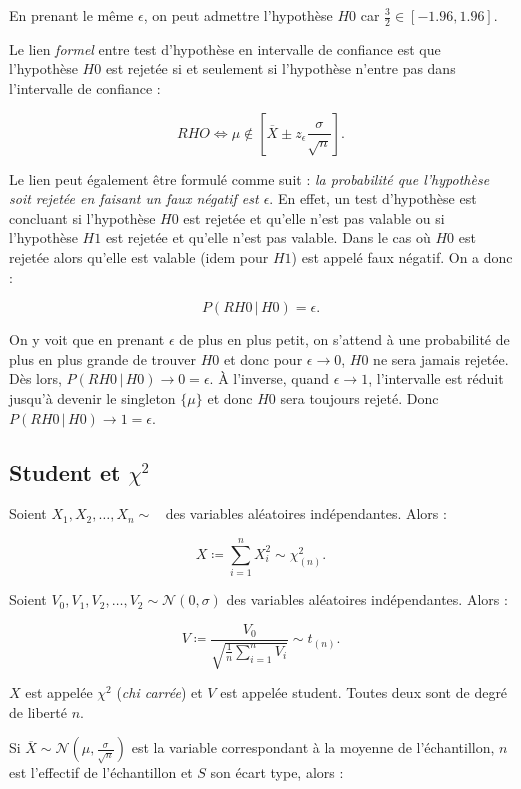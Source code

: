 \documentclass{article}
\DeclareMathOperator{\Nzo}{\mathcal N(0, 1)}
\begin{document}
		En prenant le même $\epsilon$, on peut admettre l'hypothèse $H0$ car $\frac 32 \in [-1.96, 1.96]$.

		Le lien \textit{formel} entre test d'hypothèse en intervalle de confiance est que l'hypothèse $H0$ est rejetée si et seulement si l'hypothèse n'entre pas dans l'intervalle de confiance :

		\[RHO \iff \mu \not \in \left[\overline X \pm z_\epsilon \frac \sigma{\sqrt n}\right].\]

		Le lien peut également être formulé comme suit : \textit{la probabilité que l'hypothèse soit rejetée en faisant un faux négatif est $\epsilon$}. En effet, un test d'hypothèse
		est concluant si l'hypothèse $H0$ est rejetée et qu'elle n'est pas valable ou si l'hypothèse $H1$ est rejetée et qu'elle n'est pas valable. Dans le cas où $H0$ est rejetée
		alors qu'elle est valable (idem pour $H1$) est appelé faux négatif. On a donc :

		\[P(RH0 \, | \, H0) = \epsilon.\]

		On y voit que en prenant $\epsilon$ de plus en plus petit, on s'attend à une probabilité de plus en plus grande de trouver $H0$ et donc pour $\epsilon \to 0$, $H0$ ne sera jamais rejetée.
		Dès lors, $P(RH0 \, | \, H0) \to 0 = \epsilon$. À l'inverse, quand $\epsilon \to 1$, l'intervalle est réduit jusqu'à devenir le singleton $\{\mu\}$ et donc $H0$ sera toujours rejeté.
		Donc $P(RH0 \, | \, H0) \to 1 = \epsilon$.

	\subsection{Student et $\chi^2$}
		Soient $X_1, X_2, \ldots, X_n \sim \Nzo$ des variables aléatoires indépendantes. Alors :

		\[X \coloneqq \sum_{i=1}^nX_i^2 \sim \chi^2_{(n)}.\]

		Soient $V_0, V_1, V_2, \ldots, V_2 \sim \mathcal N(0, \sigma)$ des variables aléatoires indépendantes. Alors :

		\[V \coloneqq \frac {V_0}{\sqrt {\frac 1n\sum_{i=1}^nV_i}} \sim t_{(n)}.\]

		$X$ est appelée $\chi^2$ (\textit{chi carrée}) et $V$ est appelée student. Toutes deux sont de degré de liberté $n$.

		Si $\overline X \sim \mathcal N\left(\mu, \frac \sigma{\sqrt n}\right)$ est la variable correspondant à la moyenne de l'échantillon, $n$ est l'effectif de l'échantillon et $S$ son écart type, alors :
\end{document}
